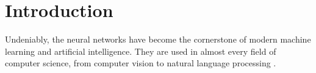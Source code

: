 \documentclass[12pt,a4paper,oneside]{book}
\theoremstyle{dplplain}
\theoremstyle{dpldefinition}
\theoremstyle{dplremark}
\begin{document}
%
%
% 
% 
%



%

%





\tableofcontents

\chapter{Introduction}

Undeniably, the neural networks have become the cornerstone of modern machine
learning and artificial intelligence. They are used in almost every field of
computer science, from computer vision \cite{nns-in-cv-1,nns-in-cv-2} to natural
language processing \cite{nns-in-nlps-1,nns-in-nlps-2}.
\end{document}
